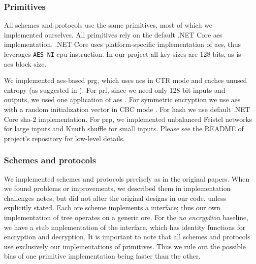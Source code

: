 		\subsubsection{Primitives}

			All schemes and protocols use the same primitives, most of which we implemented ourselves.
			All primitives rely on the default {.NET Core} \acrshort{aes} implementation.
			{.NET Core} uses platform-specific implementation of \acrshort{aes}, thus leverages \texttt{AES-NI} \acrshort{cpu} instruction.
			In our project all key sizes are 128 bits, as is \acrshort{aes} block size.

			We implemented \acrshort{aes}-based \acrshort{prg}, which uses \acrshort{aes} \cite{aes-nist} in CTR mode \cite{nist-modes} and caches unused entropy (as suggested in \cite{aes-ctr-rfc}).
			For \acrshort{prf}, since we need only 128-bit inputs and outputs, we used one application of \acrshort{aes} \cite[Proposition 3.27]{intro-to-modern-crypto}.
			For symmetric encryption we use \acrshort{aes} with a random initialization vector in CBC mode \cite[Section 3.6.2]{intro-to-modern-crypto}.
			For hash we use default {.NET Core} \acrshort{sha}-2 implementation.
			For \acrshort{prp}, we implemented unbalanced Feistel networks \cite{unbalanced-feistel} for large inputs and Knuth shuffle \cite{knuth-shuffle} for small inputs.
			Please see the README of project's repository \cite{ore-project} for low-level details.

			

		\subsubsection{Schemes and protocols}

			We implemented schemes and protocols precisely as in the original papers.
			When we found problems or improvements, we described them in implementation challenges notes, but did not alter the original designs in our code, unless explicitly stated.
			Each \acrshort{ore} scheme implements a {\Csharp} interface; thus our own implementation of {\BPlus} tree operates on a generic \acrshort{ore}.
			For the \emph{no encryption} baseline, we have a stub implementation of the interface, which has identity functions for encryption and decryption.
			It is important to note that all schemes and protocols use exclusively our implementations of primitives.
			Thus we rule out the possible bias of one primitive implementation being faster than the other.

